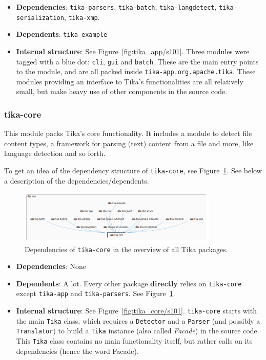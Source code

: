 \documentclass{article}
\begin{document}
\begin{itemize}
    \item \textbf{Dependencies}: \texttt{tika-parsers}, \texttt{tika-batch}, \texttt{tika-langdetect}, \texttt{tika-serialization}, \texttt{tika-xmp}.
    \item \textbf{Dependents}: \texttt{tika-example}
    \item \textbf{Internal structure}: See Figure~\ref{fig:tika_app/s101}. Three modules were tagged with a blue dot: \texttt{cli}, \texttt{gui} and \texttt{batch}. These are the main entry points to the module, and are all packed inside \texttt{tika-app.org.apache.tika}. These modules providing an interface to Tika's functionalities are all relatively small, but make heavy use of other components in the source code.
\end{itemize}

\subsubsection{tika-core}
This module packs Tika's core functionality. It includes a module to detect file content types, a framework for parsing (text) content from a file and more, like language detection and so forth.

To get an idea of the dependency structure of \texttt{tika-core}, see Figure~\ref{fig:tika_core/s101-overview}. See below a description of the dependencies/dependents.

\begin{figure}[ht]
    \centering
    \includegraphics[width=0.85\textwidth]{report/images/tika_core/s101-overview.png}
    \caption{Dependencies of \texttt{tika-core} in the overview of all Tika packages.}
    \label{fig:tika_core/s101-overview}
\end{figure}

\begin{itemize}
    \item \textbf{Dependencies}: None
    \item \textbf{Dependents}: A lot. Every other package \textbf{directly} relies on \texttt{tika-core} except \texttt{tika-app} and \texttt{tika-parsers}. See Figure~\ref{fig:tika_core/s101-overview}.
    \item \textbf{Internal structure}: See Figure~\ref{fig:tika_core/s101}. \texttt{tika-core} starts with the main \texttt{Tika} class, which requires a \texttt{Detector} and a \texttt{Parser} (and possibly a \texttt{Translator}) to build a \texttt{Tika} instance (also called \textit{Facade}) in the source code. This \texttt{Tika} class contains no main functionality itself, but rather calls on its dependencies (hence the word Facade).
\end{itemize}
\end{document}
